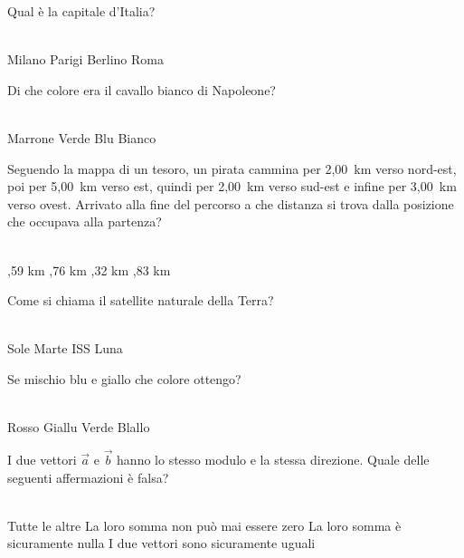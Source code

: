 \documentclass[a4paper,11pt]{exam}
\begin{document}
    
    \newpage
    
    

        \begin{center} 
        \end{center}
\begin{questions}

    
\question Qual è la capitale d’Italia?\\\
\begin{oneparchoices}
  \choice Milano
  \choice Parigi
  \choice Berlino
  \choice Roma
\end{oneparchoices}

    
\question Di che colore era il cavallo bianco di Napoleone?\\\
\begin{oneparchoices}
  \choice Marrone
  \choice Verde
  \choice Blu 
  \choice Bianco
\end{oneparchoices}

    
\question Seguendo la mappa di un tesoro, un pirata cammina per 2,00~km verso nord-est, poi per 5,00~km verso est, quindi per 2,00~km verso sud-est e infine per 3,00~km verso ovest. Arrivato alla fine del percorso a che distanza si trova dalla posizione che occupava alla partenza?\\\
\begin{oneparchoices}
  ,59 km
  \choice 4,76 km
  ,32 km
  \choice 4,83 km
\end{oneparchoices}

    
\question Come si chiama il satellite naturale della Terra?\\\
\begin{oneparchoices}
  \choice Sole
  \choice Marte
  \choice ISS
  \choice Luna
\end{oneparchoices}

    
\question Se mischio blu e giallo che colore ottengo?\\\
\begin{oneparchoices}
  \choice Rosso
  \choice Giallu
  \choice Verde
  \choice Blallo
\end{oneparchoices}

    
\question I due vettori $\vec{a}$ e $\vec{b}$ hanno lo stesso modulo e la stessa direzione. Quale delle seguenti affermazioni è falsa?\\\
\begin{oneparchoices}
  \choice Tutte le altre
  \choice La loro somma non può mai essere zero
  \choice La loro somma è sicuramente nulla
  \choice I due vettori sono sicuramente uguali
\end{oneparchoices}


\end{questions}
\end{document}
